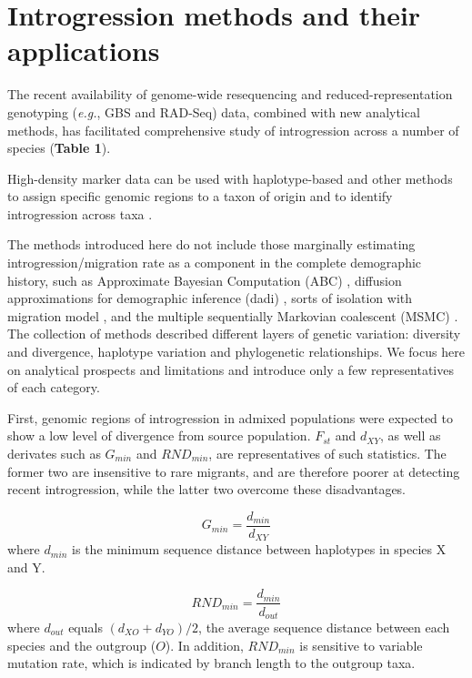 \documentclass[11pt]{article}
\begin{document}
\section*{Introgression methods and their applications}

The recent availability of genome-wide resequencing and reduced-representation genotyping (\emph{e.g.}, GBS and RAD-Seq) data, combined with new analytical methods, has facilitated comprehensive study of introgression across a number of species (\textbf{Table 1}).

High-density marker data can be used with haplotype-based and other methods to assign specific genomic regions to a taxon of origin and to identify introgression across taxa \cite{Martin2015,Price2009,Lawson2012,pease2015,rosenzweig2016,geneva2015}.

The methods introduced here do not include those marginally estimating introgression\slash migration rate as a component in the complete demographic history, such as Approximate Bayesian Computation (ABC) \cite{beaumont2002}, diffusion approximations for demographic inference (dadi) \cite {gutenkunst2009}, sorts of isolation with migration model \cite{hey2004}, and the multiple sequentially Markovian coalescent (MSMC) \cite{schiffels2014}. 
The collection of methods described different layers of genetic variation: diversity and divergence, haplotype variation and phylogenetic relationships.
We focus here on analytical prospects and limitations and introduce only a few representatives of each category.

First, genomic regions of introgression in admixed populations were expected to show a low level of divergence from source population.
$F_{st}$ and $d_{XY}$, as well as derivates such as $G_{min}$ \cite{geneva2015} and $RND_{min}$\cite{rosenzweig2016}, are representatives of such statistics. 
The former two are insensitive to rare migrants, and are therefore poorer at detecting recent introgression, while the latter two overcome these disadvantages.
 
 \begin{equation}
    G_{min} = \frac{d_{min}}{d_{XY}}
 \end{equation}
 where $d_{min}$ is the minimum sequence distance between haplotypes in species X and Y.
 
 \begin{equation}
 	RND_{min} = \frac{d_{min}}{d_{out}}
 \end{equation}
where $d_{out}$ equals $(d_{XO} + d_{YO})/2$, the average sequence distance between each species and the outgroup ($O$).
In addition, $RND_{min}$ is sensitive to variable mutation rate, which is indicated by branch length to the outgroup taxa. 
 
\end{document}
